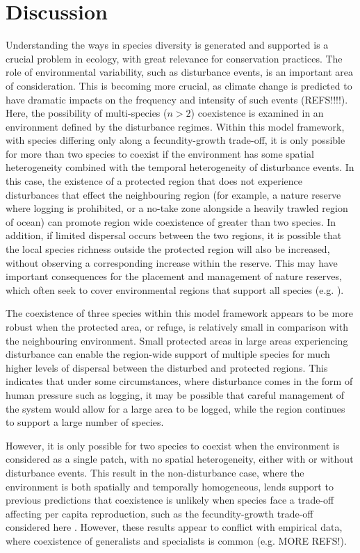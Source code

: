 \section{Discussion}
Understanding the ways in species diversity is generated and supported is a crucial problem in ecology, with great relevance for conservation practices. The role of environmental variability, such as disturbance events, is an important area of consideration. This is becoming more crucial, as climate change is predicted to have dramatic impacts on the frequency and intensity of such events (REFS!!!!). Here, the possibility of multi-species ($n>2$) coexistence is examined in an environment defined by the disturbance regimes. Within this model framework, with species differing only along a fecundity-growth trade-off, it is only possible for more than two species to coexist if the environment has some spatial heterogeneity combined with the temporal heterogeneity of disturbance events. In this case, the existence of a protected region that does not experience disturbances that effect the neighbouring region (for example, a nature reserve where logging is prohibited, or a no-take zone alongside a heavily trawled region of ocean) can promote region wide coexistence of greater than two species. In addition, if limited dispersal occurs between the two regions, it is possible that the local species richness outside the protected region will also be increased, without observing a corresponding increase within the reserve. This may have important consequences for the placement and management of nature reserves, which often seek to cover environmental regions that support all species (e.g. \cite{margules1988selecting,scott2001nature}).

The coexistence of three species within this model framework appears to be more robust when the protected area, or refuge, is relatively small in comparison with the neighbouring environment. Small protected areas in large areas experiencing disturbance can enable the region-wide support of multiple species for much higher levels of dispersal between the disturbed and protected regions. This indicates that under some circumstances, where disturbance comes in the form of human pressure such as logging, it may be possible that careful management of the system would allow for a large area to be logged, while the region continues to support a large number of species.

However, it is only possible for two species to coexist when the environment is considered as a single patch, with no spatial heterogeneity, either with or without disturbance events. This result in the non-disturbance case, where the environment is both spatially and temporally homogeneous, lends support to previous predictions that coexistence is unlikely when species face a trade-off affecting per capita reproduction, such as the fecundity-growth trade-off considered here \cite{egas2004evolution}.
 However, these results appear to conflict with empirical data, where coexistence of generalists and specialists is common (e.g. \cite{morris1996coexistence} MORE REFS!). 
 
